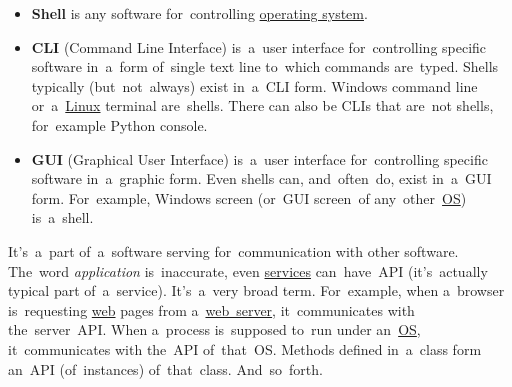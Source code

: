 \label{shellcligui}
\begin{itemize}
    \item \textbf{Shell} is any software for~controlling \hyperref[os]{operating system}.
    \item \textbf{CLI} (Command Line Interface) is~a~user interface for~controlling specific software in~a~form of~single text line to~which commands are~typed. Shells typically (but~not~always) exist in~a~CLI form. Windows command line or~a~\hyperref[unixlinux]{Linux} terminal are~shells. There can also be CLIs that are~not shells, for~example Python console.
    \item \textbf{GUI} (Graphical User Interface) is~a~user interface for~controlling specific software in~a~graphic form. Even shells can, and~often~do, exist in~a~GUI form. For~example, Windows screen (or~GUI screen~of any~other~\hyperref[os]{OS}) is~a~shell.
\end{itemize}

\label{api}
It's~a~part of~a~software serving for~communication with other software. The~word \textit{application} is~inaccurate, even \hyperref[applicationprocessprogramservicethread]{services} can~have~API (it's~actually typical part of~a~service). It's~a~very broad term. For~example, when a~browser is~requesting \hyperref[internetweb]{web} pages from a~\hyperref[webserver]{web~server}, it~communicates with the~server~API. When a~process is~supposed to~run under an~\hyperref[os]{OS}, it~communicates with the~API of~that~OS. Methods defined in~a~class form an~API (of~instances) of~that~class. And~so~forth.
